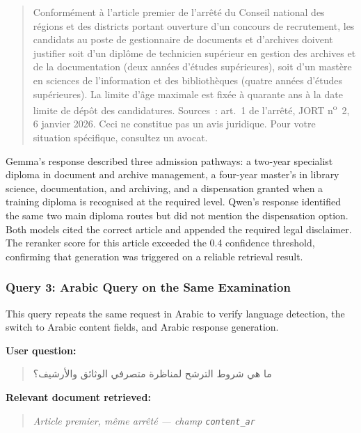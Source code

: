 \begin{quote}
Conformément à l'article premier de l'arrêté du Conseil national des régions et des districts portant ouverture d'un concours de recrutement, les candidats au poste de gestionnaire de documents et d'archives doivent justifier soit d'un diplôme de technicien supérieur en gestion des archives et de la documentation (deux années d'études supérieures), soit d'un mastère en sciences de l'information et des bibliothèques (quatre années d'études supérieures). La limite d'âge maximale est fixée à quarante ans à la date limite de dépôt des candidatures.
Sources~: art.~1 de l'arrêté, JORT n\textsuperscript{o}~2, 6 janvier 2026. Ceci ne constitue pas un avis juridique. Pour votre situation spécifique, consultez un avocat.
\end{quote}

Gemma's response described three admission pathways: a two-year specialist diploma in document and archive management, a four-year master's in library science, documentation, and archiving, and a dispensation granted when a training diploma is recognised at the required level. Qwen's response identified the same two main diploma routes but did not mention the dispensation option. Both models cited the correct article and appended the required legal disclaimer. The reranker score for this article exceeded the 0.4 confidence threshold, confirming that generation was triggered on a reliable retrieval result.

\subsubsection{Query 3: Arabic Query on the Same Examination}
\label{subsubsec:ch4-query3}

This query repeats the same request in Arabic to verify language detection, the switch to Arabic content fields, and Arabic response generation.

\vspace{0.5em}

\noindent\textbf{User question:}

\begin{quote}
\textarabic{ما هي شروط الترشح لمناظرة متصرفي الوثائق والأرشيف؟}
\end{quote}

\noindent\textbf{Relevant document retrieved:}

\begin{quote}
\textit{Article premier, même arrêté --- champ \texttt{content\_ar}}
\end{quote}

